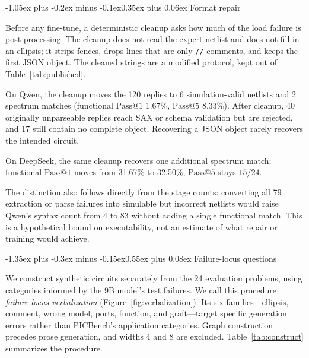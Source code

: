 \documentclass[11pt]{article}
\makeatletter
\renewcommand\section{\@startsection{section}{1}{\z@}%
  {-1.35ex plus -0.3ex minus -0.15ex}{0.55ex plus 0.08ex}%
  {\normalfont\large\bfseries}}
\renewcommand\subsection{\@startsection{subsection}{2}{\z@}%
  {-1.05ex plus -0.2ex minus -0.1ex}{0.35ex plus 0.06ex}%
  {\normalfont\normalsize\bfseries}}
\newcommand{\passk}[1]{\mathrm{Pass@}#1}
\makeatother
\begin{document}
\subsection{Format repair}
\label{sec:repair}

Before any fine-tune, a deterministic cleanup asks how much of the load failure is post-processing.
The cleanup does not read the expert netlist and does not fill in an ellipsis; it strips fences, drops lines that are only \texttt{//} comments, and keeps the first JSON object.
The cleaned strings are a modified protocol, kept out of Table~\ref{tab:published}.

On Qwen, the cleanup moves the 120 replies to 6 simulation-valid netlists and 2 spectrum matches (functional $\passk{1}$ 1.67\%, $\passk{5}$ 8.33\%).
After cleanup, 40 originally unparseable replies reach SAX or schema validation but are rejected, and 17 still contain no complete object. Recovering a JSON object rarely recovers the intended circuit.

On DeepSeek, the same cleanup recovers one additional spectrum match; functional $\passk{1}$ moves from 31.67\% to 32.50\%, $\passk{5}$ stays $15/24$.

The distinction also follows directly from the stage counts: converting all 79 extraction or parse failures into simulable but incorrect netlists would raise Qwen's syntax count from 4 to 83 without adding a single functional match. This is a hypothetical bound on executability, not an estimate of what repair or training would achieve.

\section{Failure-locus questions}
\label{sec:lociq}

We construct synthetic circuits separately from the 24 evaluation problems, using categories informed by the 9B model's test failures. We call this procedure \emph{failure-locus verbalization} (Figure~\ref{fig:verbalization}). Its six families---ellipsis, comment, wrong model, ports, function, and graft---target specific generation errors rather than PICBench's application categories. Graph construction precedes prose generation, and widths $4$ and $8$ are excluded. Table~\ref{tab:construct} summarizes the procedure.
\end{document}
